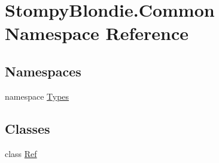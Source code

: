 \hypertarget{namespace_stompy_blondie_1_1_common}{}\section{Stompy\+Blondie.\+Common Namespace Reference}
\label{namespace_stompy_blondie_1_1_common}
\subsection*{Namespaces}
\begin{DoxyCompactItemize}
\item 
namespace \mbox{\hyperlink{namespace_stompy_blondie_1_1_common_1_1_types}{Types}}
\end{DoxyCompactItemize}
\subsection*{Classes}
\begin{DoxyCompactItemize}
\item 
class \mbox{\hyperlink{class_stompy_blondie_1_1_common_1_1_ref}{Ref}}
\end{DoxyCompactItemize}
